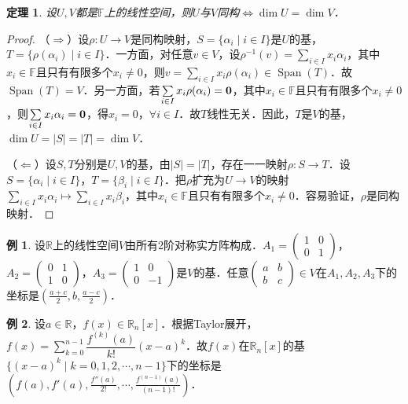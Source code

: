 \documentclass[a4paper,fontset=windows]{ctexbook}
\newtheorem{theorem}{定理}[chapter]
\theoremstyle{definition}
\newtheorem{example}{例}[chapter]
\DeclareMathOperator{\Span}{Span}
\begin{document}
\begin{theorem}\label{thm8.12}
设$U,V$都是$\mathbb{F}$上的线性空间，则$U$与$V$同构$\Leftrightarrow\dim U=\dim V$．
\end{theorem}

\begin{proof}
（$\Rightarrow$）设$\rho:U\to V$是同构映射，$S=\{\alpha_i\mid i\in I\}$是$U$的基，$T=\{\rho(\alpha_i)\mid i\in I\}$．一方面，对任意$v\in V$，设$\rho^{-1}(v)=\sum\limits_{i\in I}x_i\alpha_i$，其中$x_i\in\mathbb{F}$且只有有限多个$x_i\ne 0$，则$v=\sum\limits_{i\in I}x_i\rho(\alpha_i)\in\Span(T)$．故$\Span(T)=V$．另一方面，若$\sum\limits_{i\in I}x_i\rho(\alpha_i)={\bf 0}$，其中$x_i\in\mathbb{F}$且只有有限多个$x_i\ne 0$，则$\sum\limits_{i\in I}x_i\alpha_i={\bf 0}$，得$x_i=0$，$\forall i\in I$．故$T$线性无关．因此，$T$是$V$的基，$\dim U=|S|=|T|=\dim V$．

（$\Leftarrow$）设$S,T$分别是$U,V$的基，由$|S|=|T|$，存在一一映射$\rho:S\to T$．设$S=\{\alpha_i\mid i\in I\}$，$T=\{\beta_i\mid i\in I\}$．把$\rho$扩充为$U\to V$的映射$\sum\limits_{i\in I}x_i\alpha_i\mapsto\sum\limits_{i\in I}x_i\beta_i$，其中$x_i\in\mathbb{F}$且只有有限多个$x_i\ne 0$．容易验证，$\rho$是同构映射．
\end{proof}

\begin{example}
设$\mathbb{R}$上的线性空间$V$由所有2阶对称实方阵构成．$A_1=\begin{pmatrix}1&0 \\ 0&1\end{pmatrix}$，$A_2=\begin{pmatrix}0&1 \\ 1&0\end{pmatrix}$，$A_3=\begin{pmatrix}1&0 \\ 0&-1\end{pmatrix}$是$V$的基．任意$\begin{pmatrix}a&b \\ b&c\end{pmatrix}\in V$在$A_1,A_2,A_3$下的坐标是$\left(\frac{a+c}{2},b,\frac{a-c}{2}\right)$．
\end{example}

\begin{example}\label{ex8.17}
设$a\in\mathbb{R}$，$f(x)\in\mathbb{R}_n[x]$．根据Taylor展开，$f(x)=\sum\limits_{k=0}^{n-1}\dfrac{f^{(k)}(a)}{k!}(x-a)^k$．故$f(x)$在$\mathbb{R}_n[x]$的基$\{(x-a)^k\mid k=0,1,2,\cdots,n-1\}$下的坐标是$\left(f(a),f'(a),\frac{f''(a)}{2!},\cdots,\frac{f^{(n-1)}(a)}{(n-1)!}\right)$．
\end{example}
\end{document}
